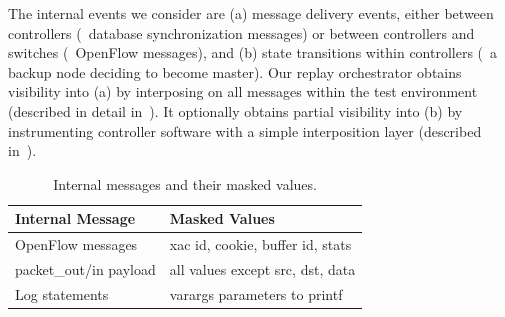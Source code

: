 The internal events we consider are
(a) message delivery events, either between controllers (\eg~database
synchronization messages) or
between controllers and switches (\eg~OpenFlow messages), and (b) state transitions
within controllers (\eg~a backup node deciding to become master).
Our replay orchestrator obtains visibility into (a) by interposing on all messages within the test
environment (described in detail in~\cite{sts2014}).
It optionally obtains partial visibility into (b) by instrumenting controller
software with a simple interposition layer (described in~\cite{sts2014}).




\begin{table}[tb]
\centering
\footnotesize
\begin{tabular}{|l|l|}
\hline
{\bf Internal Message} & {\bf Masked Values} \\
\hline
\hline
OpenFlow messages & xac id, cookie, buffer id, stats \\
\hline
packet\_out/in payload & all values except src, dst, data \\
\hline
Log statements & varargs parameters to printf \\
\hline
\end{tabular}
\caption{Internal messages and their masked values. %
}
\label{tab:fingerprints}
\vspace{-0.6cm}
\end{table}

